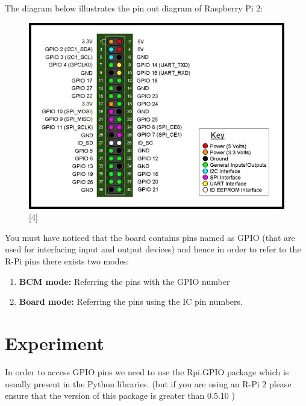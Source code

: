 \documentclass[11pt,a4paper]{article}
\begin{document}
	\newpage
	The diagram below illustrates the pin out diagram of Raspberry Pi 2:
	\begin{figure}[h!]
		\includegraphics[scale=0.6]{RaspberryPi2_pinout.jpg}
		\centering
		\caption{[4]}
	\end{figure} 
	
	\flushleft
	You must have noticed that the board contains pins named as GPIO (that are used for interfacing input and output devices) and hence in order to refer to the R-Pi pins there exists two modes:
	\begin{enumerate}
		\item \textbf{BCM mode:} Referring the pins with the GPIO number
		\item \textbf{Board mode:} Referring the pins using the IC pin numbers.
	\end{enumerate}
	
	\flushleft
	\newpage
	\section{Experiment}
	 In order to access GPIO pins we need to use the Rpi.GPIO package which is usually present in the Python libraries. (but if you are using an R-Pi 2 please ensure that the version of this package is greater than 0.5.10 )
	 
\end{document}
